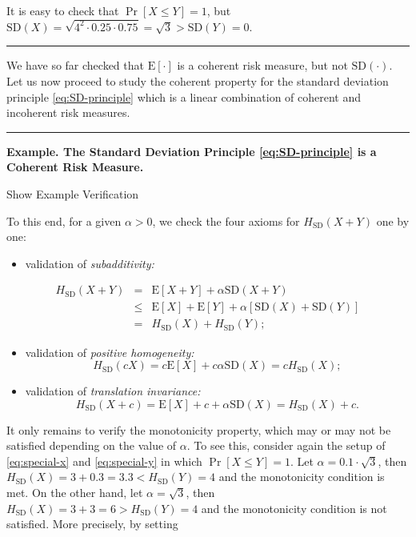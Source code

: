\documentclass[]{book}
\providecommand{\tightlist}{%
  \setlength{\itemsep}{0pt}\setlength{\parskip}{0pt}}
\theoremstyle{definition}
\theoremstyle{definition}
\theoremstyle{definition}
\theoremstyle{remark}
\begin{document}
It is easy to check that \(\Pr[X\leq Y]=1\), but
\(\mathrm{SD}(X)=\sqrt{4^2\cdot 0.25\cdot 0.75}=\sqrt{3}>\mathrm{SD}(Y)=0\).

\begin{center}\rule{0.5\linewidth}{\linethickness}\end{center}

We have so far checked that \(\mathrm{E}[\cdot]\) is a coherent risk
measure, but not \(\mathrm{SD}(\cdot)\). Let us now proceed to study the
coherent property for the standard deviation principle
\eqref{eq:SD-principle} which is a linear combination of coherent and
incoherent risk measures.

\begin{center}\rule{0.5\linewidth}{\linethickness}\end{center}

\textbf{Example. The Standard Deviation Principle \eqref{eq:SD-principle}
is a Coherent Risk Measure.}

Show Example Verification

\hypertarget{toggleExamplePortMgt.2.2}{}
To this end, for a given \(\alpha>0\), we check the four axioms for
\(H_{\mathrm{SD}}(X+Y)\) one by one:

\begin{itemize}
\tightlist
\item
  validation of \emph{subadditivity:}
\end{itemize}

\begin{eqnarray*}
  H_{\mathrm{SD}}(X+Y) &=& \mathrm{E}[X+Y]+\alpha \mathrm{SD}(X+Y) \\
  &\leq& \mathrm{E}[X]+\mathrm{E}[Y]+\alpha [\mathrm{SD}(X) +\mathrm{SD}(Y)]\\
  &=& H_{\mathrm{SD}}(X)+ H_{\mathrm{SD}}(Y);
\end{eqnarray*}

\begin{itemize}
\tightlist
\item
  validation of \emph{positive homogeneity:} \[
  H_{\mathrm{SD}}(cX)=c\mathrm{E}[X]+c\alpha\mathrm{SD}(X)=cH_{\mathrm{SD}}(X);
  \]
\item
  validation of \emph{translation invariance:} \[
  H_{\mathrm{SD}}(X+c)=\mathrm{E}[X]+c+\alpha\mathrm{SD}(X)=H_{\mathrm{SD}}(X)+c.
  \]
\end{itemize}

It only remains to verify the monotonicity property, which may or may
not be satisfied depending on the value of \(\alpha\). To see this,
consider again the setup of \eqref{eq:special-x} and \eqref{eq:special-y} in
which \(\Pr[X\leq Y]=1\). Let \(\alpha=0.1\cdot \sqrt{3}\), then
\(H_{\mathrm{SD}}(X)=3+0.3=3.3< H_{\mathrm{SD}}(Y)=4\) and the
monotonicity condition is met. On the other hand, let
\(\alpha=\sqrt{3}\), then
\(H_{\mathrm{SD}}(X)=3+3=6> H_{\mathrm{SD}}(Y)=4\) and the monotonicity
condition is not satisfied. More precisely, by setting
\end{document}
